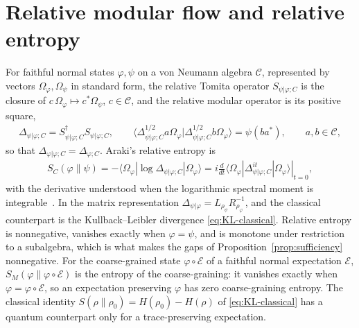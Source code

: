\documentclass[a4paper,11pt]{article}
\theoremstyle{definition}
\newcommand{\mE}{\mathcal{E}}
\begin{document}
\section{Relative modular flow and relative entropy}
For faithful normal states $\varphi,\psi$ on a von Neumann algebra $\mathcal C$, represented by vectors $\Omega_\varphi,\Omega_\psi$ in standard form, the relative Tomita operator $S_{\psi|\varphi;C}$ is the closure of $c\,\Omega_\varphi\mapsto c^*\Omega_\psi$, $c\in\mathcal C$, and the relative modular operator is its positive square,
\begin{align}
 \Delta_{\psi|\varphi;C}=S_{\psi|\varphi;C}^\dagger S_{\psi|\varphi;C},
 \qquad
 \langle\Delta_{\psi|\varphi;C}^{1/2}a\Omega_\varphi|\Delta_{\psi|\varphi;C}^{1/2}b\Omega_\varphi\rangle=\psi(ba^*),\qquad a,b\in\mathcal C,
 \label{eq:relative-modular}
\end{align}
so that $\Delta_{\varphi|\varphi;C}=\Delta_{\varphi;C}$. Araki's relative entropy is
\begin{align}
 S_C(\varphi\|\psi)
 =-\langle\Omega_\varphi|\log\Delta_{\psi|\varphi;C}|\Omega_\varphi\rangle
 =i\left.\frac{d}{dt}\langle\Omega_\varphi|\Delta_{\psi|\varphi;C}^{it}|\Omega_\varphi\rangle\right|_{t=0},
 \label{eq:relative-entropy}
\end{align}
with the derivative understood when the logarithmic spectral moment is integrable~\cite{Araki1976,Araki1977}. In the matrix representation $\Delta_{\psi|\varphi}=L_{\rho_\psi}R_{\rho_\varphi}^{-1}$, and the classical counterpart is the Kullback--Leibler divergence \eqref{eq:KL-classical}. Relative entropy is nonnegative, vanishes exactly when $\varphi=\psi$, and is monotone under restriction to a subalgebra, which is what makes the gaps of Proposition~\ref{prop:sufficiency} nonnegative. For the coarse-grained state $\varphi\circ\mE$ of a faithful normal expectation $\mE$, $S_M(\varphi\|\varphi\circ\mE)$ is the entropy of the coarse-graining: it vanishes exactly when $\varphi=\varphi\circ\mE$, so an expectation preserving $\varphi$ has zero coarse-graining entropy. The classical identity $S(\rho\|\rho_0)=H(\rho_0)-H(\rho)$ of \eqref{eq:KL-classical} has a quantum counterpart only for a trace-preserving expectation.



\end{document}
